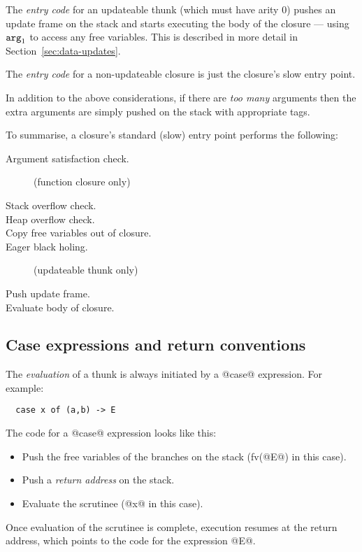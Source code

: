 \documentclass[11pt]{article}
\newcommand{\Arg}[1]{\mbox{${\tt arg}_{#1}$}}
\newcommand{\secref}[1]{Section~\ref{sec:#1}}
\newcommand{\Subsection}[2]{\subsection{#1}\label{sec:#2}}
\begin{document}
\begin{enumerate}
The \emph{entry code} for an updateable thunk (which must have arity 0)
pushes an update frame on the stack and starts executing the body of
the closure --- using \Arg{1} to access any free variables.  This is
described in more detail in \secref{data-updates}.

The \emph{entry code} for a non-updateable closure is just the
closure's slow entry point.

\end{enumerate}

In addition to the above considerations, if there are \emph{too many}
arguments then the extra arguments are simply pushed on the stack with
appropriate tags.

To summarise, a closure's standard (slow) entry point performs the
following:

\begin{description}
\item[Argument satisfaction check.] (function closure only)
\item[Stack overflow check.]
\item[Heap overflow check.]
\item[Copy free variables out of closure.] %
\item[Eager black holing.] (updateable thunk only) %
\item[Push update frame.]
\item[Evaluate body of closure.]
\end{description}


\Subsection{Case expressions and return conventions}{return-conventions}

The \emph{evaluation} of a thunk is always initiated by
a @case@ expression.  For example:
\begin{verbatim}
  case x of (a,b) -> E
\end{verbatim}

The code for a @case@ expression looks like this:

\begin{itemize}
\item Push the free variables of the branches on the stack (fv(@E@) in
this case).
\item  Push a \emph{return address} on the stack.
\item  Evaluate the scrutinee (@x@ in this case).
\end{itemize}

Once evaluation of the scrutinee is complete, execution resumes at the
return address, which points to the code for the expression @E@.
\end{document}
